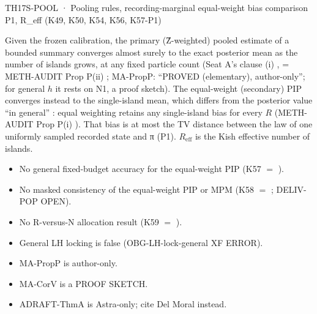 \begin{card}{TH17}{S-POOL · Pooling rules, recording-marginal equal-weight bias comparison P1, R\_eff (K49, K50, K54, K56, K57-P1)}
\begin{plain}
Given the frozen calibration, the primary (Ẑ-weighted) pooled estimate of a bounded summary converges almost surely to the exact posterior mean as the number of islands grows, at any fixed particle count (Seat A's clause (i) , = METH-AUDIT Prop P(ii) ; MA-PropP: ``PROVED (elementary), author-only''; for general $h$ it rests on N1, a proof sketch). The equal-weight (secondary) PIP converges instead to the single-island mean, which differs from the posterior value ``in general'' : equal weighting retains any single-island bias for every $R$ (METH-AUDIT Prop P(i) ). That bias is at most the TV distance between the law of one uniformly sampled recorded state and π (P1). $R_{\mathrm{eff}}$ is the Kish effective number of islands.
\end{plain}
\begin{notproved}
\begin{itemize}
\item No general fixed-budget accuracy for the equal-weight PIP (K57 $=$ ).
\item No masked consistency of the equal-weight PIP or MPM (K58 $=$ ; DELIV-POP OPEN).
\item No R-versus-N allocation result (K59 $=$ ).
\item General LH locking is false (OBG-LH-lock-general XF ERROR).
\item MA-PropP is author-only.
\item MA-CorV is a PROOF SKETCH.
\item ADRAFT-ThmA is Astra-only; cite Del Moral instead.
\end{itemize}
\end{notproved}
\end{card}

